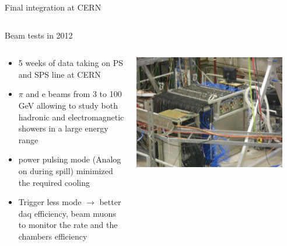 \documentclass[10pt]{beamer}
\begin{document}
\begin{frame}{Final integration at CERN}
\begin{columns}
\begin{column}{0.5\textwidth}
      \end{column}
    \end{columns}
\end{frame}

\begin{frame}{Beam tests in 2012}
  \begin{columns}
    \begin{column}{0.4\textwidth}
      \begin{block}{}
        \begin{itemize}
        \item 5 weeks of data taking on PS and SPS line at CERN
        \item $\pi$ and e beams from 3 to 100 GeV allowing to study both hadronic and electromagnetic showers in a large energy range
         \item power pulsing mode (Analog on during spill) minimized the required cooling
         \item Trigger less mode $\rightarrow$ better daq efficiency, beam muons to monitor the rate and the chambers efficiency
        \end{itemize}
      \end{block}
    \end{column}
    \begin{column}{0.6\textwidth}
      \centerline{\includegraphics[width=0.9\textwidth,height=0.5\textheight]{jpg/1m3Photo.jpg}}
    \end{column}
  \end{columns}
\end{frame}
\end{document}
